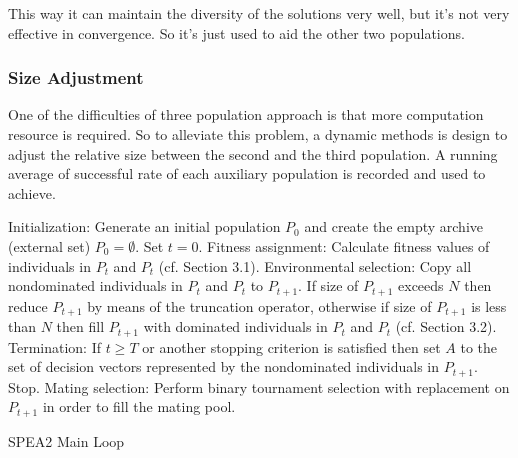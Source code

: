 \documentclass[sigconf]{acmart}
\begin{document}
This way it can maintain the diversity of the solutions very well, but it's not very effective in convergence. So it's just used to aid the other two populations.




\subsubsection{Size Adjustment}
One of the difficulties of three population approach is that more computation resource is required. So to alleviate this problem, a dynamic methods is design to adjust the relative size between the second and the third population. A running average of successful rate of each auxiliary population is recorded and used to achieve.

\begin{algorithm}
  \SetAlgoLined
  \DontPrintSemicolon
  \BlankLine
  Initialization: Generate an initial population $P_0$ and create the empty archive (external set) $P_0 = \emptyset$. Set $t = 0$.\;
  Fitness assignment: Calculate fitness values of individuals in $P_t$ and $P_t$ (cf. Section 3.1).\;
  Environmental selection: Copy all nondominated individuals in $P_t$ and $P_t$ to $P_{t+1}$. If size of $P_{t+1}$ exceeds $N$ then reduce $P_{t+1}$ by means of the truncation operator, otherwise if size of $P_{t+1}$ is less than $N$ then fill $P_{t+1}$ with dominated individuals in $P_t$ and $P_t$ (cf. Section 3.2).\;
  Termination: If $t \geq T$ or another stopping criterion is satisfied then set $A$ to the set of decision vectors represented by the nondominated individuals in $P_{t+1}$. Stop.\;
  Mating selection: Perform binary tournament selection with replacement on $P_{t+1}$ in order to fill the mating pool.\;
  \caption{SPEA2 Main Loop}
\end{algorithm}
\end{document}
